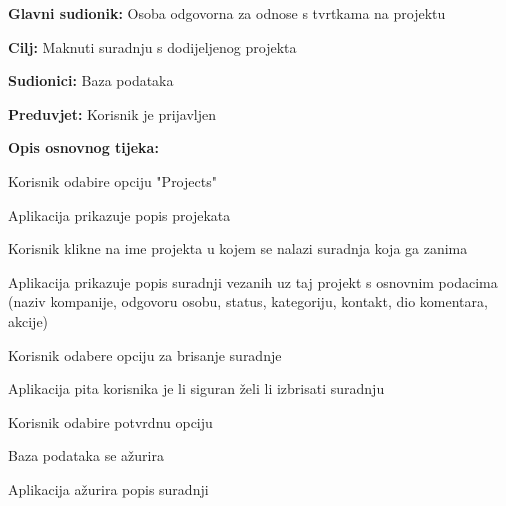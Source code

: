 					\noindent {}
					\begin{packed_item}

						\item \textbf{Glavni sudionik:} Osoba odgovorna za odnose s tvrtkama na projektu
						\item \textbf{Cilj:} Maknuti suradnju s dodijeljenog projekta
						\item \textbf{Sudionici:} Baza podataka
						\item \textbf{Preduvjet:} Korisnik je prijavljen
						\item \textbf{Opis osnovnog tijeka:}

						\item[] \begin{packed_enum}

							\item Korisnik odabire opciju "Projects"
							\item Aplikacija prikazuje popis projekata
							\item Korisnik klikne na ime projekta u kojem se nalazi suradnja koja ga zanima
							\item Aplikacija prikazuje popis suradnji vezanih uz taj projekt s osnovnim podacima (naziv kompanije, odgovoru osobu, status, kategoriju, kontakt, dio komentara, akcije)
                            \item Korisnik odabere opciju za brisanje suradnje
                            \item Aplikacija pita korisnika je li siguran želi li izbrisati suradnju
                            \item Korisnik odabire potvrdnu opciju
                            \item Baza podataka se ažurira
                            \item Aplikacija ažurira popis suradnji
                            
						\end{packed_enum}
					\end{packed_item}

